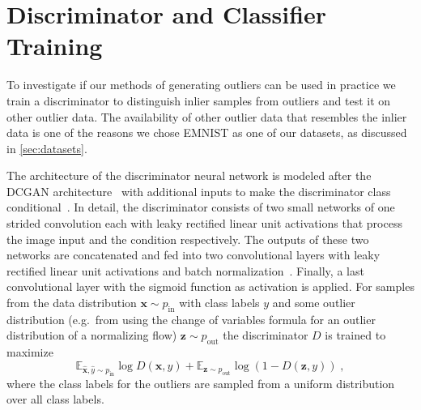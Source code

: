 \section{Discriminator and Classifier Training}%
\label{sec:discriminator_training}

To investigate if our methods of generating outliers can be used in practice we
train a discriminator to distinguish inlier samples from outliers and test it
on other outlier data. The availability of other outlier data that resembles
the inlier data is one of the reasons we chose EMNIST as one of our datasets,
as discussed in \autoref{sec:datasets}.

The architecture of the discriminator neural network is modeled after the
DCGAN architecture~\citep{radfordUnsupervisedRepresentationLearning2016} with
additional inputs to make the discriminator class
conditional~\citep{mirzaConditionalGenerativeAdversarial2014}. In detail, the
discriminator consists of two small networks of one strided convolution each
with leaky rectified linear unit activations that process the image input and
the condition respectively. The outputs of these two networks are concatenated
and fed into two convolutional layers with leaky rectified linear unit
activations and batch
normalization~\citep{ioffeBatchNormalizationAccelerating2015}. Finally, a last
convolutional layer with the sigmoid function as activation is applied.
For samples from the data distribution $\mathbf{x} \sim p_{\mathrm{in}}$ with class
labels $y$ and some outlier distribution (e.g.\ from using the change of variables formula
for an outlier distribution of a normalizing flow) $\mathbf{z} \sim p_{\mathrm{out}}$
the discriminator $D$ is trained to maximize
\begin{equation}
	\mathbb{E}_{\hat{\mathbf{x}}, \hat{y} \sim p_{\mathrm{in}}}
        \log D(\mathbf{x}, y) +
	\mathbb{E}_{\mathbf{z} \sim p_{\mathrm{out}}} \log ( 1 - D(\mathbf{z},
        y) )\;,
\end{equation}
where the class labels for the outliers are sampled from a uniform distribution
over all class labels.

